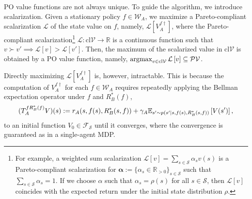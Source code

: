 \documentclass{acml}
\providecommand{\argmax}{\operatornamewithlimits{argmax}} %
\providecommand{\R}{\mathbb{R}} %
\providecommand{\E}{\mathbb{E}} %
\begin{document}
PO value functions are not always unique. 
To guide the algorithm, we introduce scalarization.
Given a stationary policy $f\in\mathcal{W}_A$, 
we maximize a Pareto-compliant scalarization $\mathcal{L}$ of the state value on $f$, namely, $\mathcal{L}[  V_A^{f\dag}]$, where the Pareto-compliant scalarization\footnote{
	For example, a weighted sum scalarization $\mathcal{L}[v] = \sum_{s \in \mathcal{S}} \alpha_s v(s)$ is a Pareto-compliant scalarization for $\boldsymbol{\alpha}:=\{\alpha_s\in\R_{>0}\}_{s\in\mathcal{S}}$ such that $\sum_{s\in\mathcal{S}}\alpha_s=1$.
	If we choose $\alpha$ such that $\alpha_s = \rho(s)$ for all $s \in \mathcal{S}$, then $\mathcal{L}[v]$ coincides with the expected return under the initial state distribution $\rho$.
} $\mathcal{L}: \mathrm{cl}\mathcal{V} \to \R$ is a continuous function such that $v \succ v' \implies \mathcal{L}[v] > \mathcal{L}[v']$. 
Then, the maximum of the scalarized value in $\mathrm{cl}\mathcal{V}$ is obtained by a PO value function, namely,
$\argmax_{v \in \mathrm{cl}\mathcal{V}} \mathcal{L}\left[ v \right] \subseteq \mathcal{PV}$.

Directly maximizing $\mathcal{L}[V_A^{f\dag}]$ is, however, intractable.
This is because the computation of $V_A^{f\dag}$ for each $f \in \mathcal{W}_A$ requires
repeatedly applying the Bellman expectation operator under $f$ and $R_B^*(f)$,
\begin{equation*}
	(T_A^{f R_B^*(f)}V)(s):=r_A(s,f(s),R_B^*(s,f))\\+\gamma_A\E_{s'\sim p(s'|s,f(s),R_B^*(s,f))}\left[V(s')\right],
\end{equation*}
to an initial function $V_0\in\mathcal{F}_{\mathcal{S}}$ until it converges, where the convergence is guaranteed as in a single-agent MDP.
\end{document}
